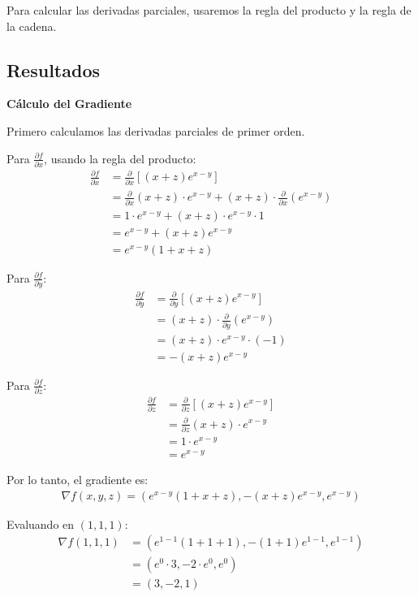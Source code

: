 \documentclass{article}
\begin{document}
Para calcular las derivadas parciales, usaremos la regla del producto y la regla de la cadena.

\subsection{Resultados}
\setcounter{equation}{0}

\textbf{Cálculo del Gradiente}

Primero calculamos las derivadas parciales de primer orden.

Para $\frac{\partial f}{\partial x}$, usando la regla del producto:
\begin{align}
\frac{\partial f}{\partial x} &= \frac{\partial}{\partial x}[(x + z)e^{x-y}] \\
&= \frac{\partial}{\partial x}(x + z) \cdot e^{x-y} + (x + z) \cdot \frac{\partial}{\partial x}(e^{x-y}) \\
&= 1 \cdot e^{x-y} + (x + z) \cdot e^{x-y} \cdot 1 \\
&= e^{x-y} + (x + z)e^{x-y} \\
&= e^{x-y}(1 + x + z)
\end{align}

Para $\frac{\partial f}{\partial y}$:
\begin{align}
\frac{\partial f}{\partial y} &= \frac{\partial}{\partial y}[(x + z)e^{x-y}] \\
&= (x + z) \cdot \frac{\partial}{\partial y}(e^{x-y}) \\
&= (x + z) \cdot e^{x-y} \cdot (-1) \\
&= -(x + z)e^{x-y}
\end{align}

Para $\frac{\partial f}{\partial z}$:
\begin{align}
\frac{\partial f}{\partial z} &= \frac{\partial}{\partial z}[(x + z)e^{x-y}] \\
&= \frac{\partial}{\partial z}(x + z) \cdot e^{x-y} \\
&= 1 \cdot e^{x-y} \\
&= e^{x-y}
\end{align}

Por lo tanto, el gradiente es:
\begin{align}
\nabla f(x,y,z) = \left(e^{x-y}(1 + x + z), -(x + z)e^{x-y}, e^{x-y}\right)
\end{align}

Evaluando en $(1, 1, 1)$:
\begin{align}
\nabla f(1,1,1) &= \left(e^{1-1}(1 + 1 + 1), -(1 + 1)e^{1-1}, e^{1-1}\right) \\
&= \left(e^0 \cdot 3, -2 \cdot e^0, e^0\right) \\
&= (3, -2, 1)
\end{align}
\end{document}
